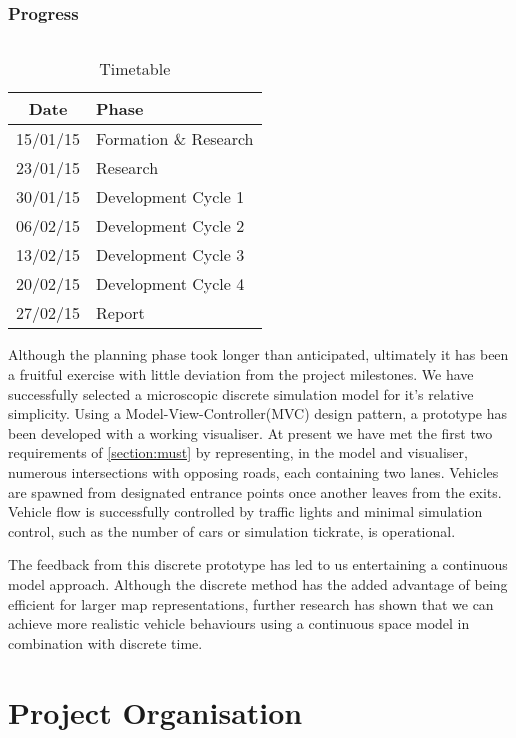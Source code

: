 \documentclass[11pt,a4paper]{article}
\begin{document}
\section{Progress}
\paragraph{}
\begin{wraptable}{r}{6cm}
	\begin{tabular}{|c|l|}
	\hline
	\textbf{Date} & \textbf{Phase} \\ \hline
	15/01/15 & Formation \& Research \\ \hline
	23/01/15 & Research \\ \hline
	30/01/15 & Development Cycle 1 \\ \hline
	06/02/15 & Development Cycle 2 \\ \hline
	13/02/15 & Development Cycle 3 \\ \hline
	20/02/15 & Development Cycle 4 \\ \hline
	27/02/15 & Report \\ \hline
	\end{tabular}
	\caption{Timetable}
\end{wraptable}
Although the planning phase took longer than anticipated, ultimately it has been a fruitful exercise with little deviation from the project milestones.  We have successfully selected a microscopic discrete simulation model for it's relative simplicity.  Using a Model-View-Controller(MVC) design pattern, a prototype has been developed with a working visualiser.  At present we have met the first two requirements of \ref{section:must} by representing, in the model and visualiser, numerous intersections with opposing roads, each containing two lanes.  Vehicles are spawned from designated entrance points once another leaves from the exits.  Vehicle flow is successfully controlled by traffic lights and minimal simulation control, such as the number of cars or simulation tickrate, is operational.

The feedback from this discrete prototype has led to us entertaining a continuous model approach.  Although the discrete method has the added advantage of being efficient for larger map representations, further research has shown that we can achieve more realistic vehicle behaviours using a continuous space model in combination with discrete time.


\part*{Project Organisation}
\end{document}

